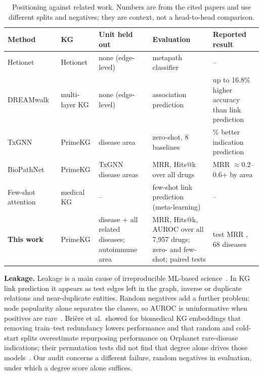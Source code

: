 \documentclass[journal]{IEEEtran}
\begin{document}
\begin{table}[!t]
\centering
\caption{Positioning against related work. Numbers are from the cited papers and use different splits and negatives; they are context, not a head-to-head comparison.}
\label{tab:related}
\small
\renewcommand{\arraystretch}{1.12}
\begin{tabular}{>{\raggedright\arraybackslash}p{2.3cm}>{\raggedright\arraybackslash}p{2.0cm}>{\raggedright\arraybackslash}p{3.6cm}>{\raggedright\arraybackslash}p{3.6cm}>{\raggedright\arraybackslash}p{4.1cm}}
\toprule
Method & KG & Unit held out & Evaluation & Reported result \\
\midrule
Hetionet~\cite{himmelstein2017hetionet} & Hetionet & none (edge-level) & metapath classifier & -- \\
DREAMwalk~\cite{bang2023dreamwalk} & multi-layer KG & none (edge-level) & association prediction & up to 16.8\% higher accuracy than link prediction \\
TxGNN~\cite{huang2024txgnn} & PrimeKG & disease area & zero-shot, 8 baselines & 49.2\% better indication prediction \\
BioPathNet~\cite{hu2026biopathnet} & PrimeKG & TxGNN disease areas & MRR, Hits@k over all drugs & MRR $\approx$0.2--0.6+ by area \\
Few-shot attention~\cite{yang2024fewshot} & medical KG & -- & few-shot link prediction (meta-learning) & -- \\
\textbf{This work} & PrimeKG & disease + all related diseases; autoimmune area & MRR, Hits@k, AUROC over all 7,957 drugs; zero- and few-shot; paired tests & test MRR \TestMrr{}, 68 diseases \\
\bottomrule
\end{tabular}
\end{table}

\textbf{Leakage.} Leakage is a main cause of irreproducible ML-based science~\cite{kapoor2023leakage}. In KG link prediction it appears as test edges left in the graph, inverse or duplicate relations and near-duplicate entities. Random negatives add a further problem: node popularity alone separates the classes, so AUROC is uninformative when positives are rare~\cite{saito2015prc,davis2006prroc}. Bri\`ere et al.\ showed for biomedical KG embeddings that removing train--test redundancy lowers performance and that random and cold-start splits overestimate repurposing performance on Orphanet rare-disease indications; their permutation tests did not find that degree alone drives those models~\cite{briere2026leakage}. Our audit concerns a different failure, random negatives in evaluation, under which a degree score alone suffices.
\end{document}
